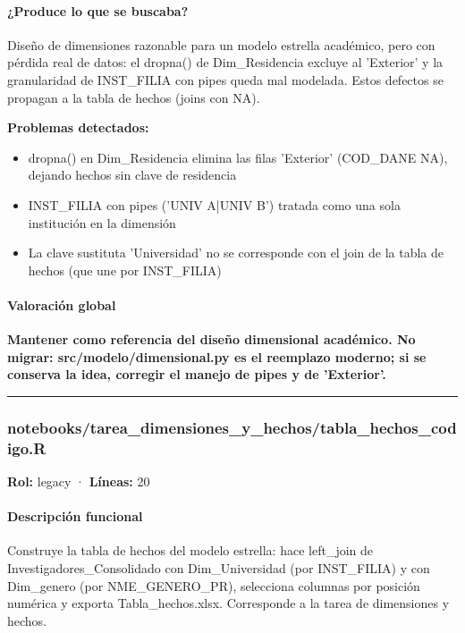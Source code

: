 \paragraph{¿Produce lo que se buscaba?}
Diseño de dimensiones razonable para un modelo estrella académico, pero con pérdida real de datos: el dropna() de Dim\_Residencia excluye al 'Exterior' y la granularidad de INST\_FILIA con pipes queda mal modelada. Estos defectos se propagan a la tabla de hechos (joins con NA).

\begin{tcolorbox}[riesgo]
\textbf{Problemas detectados:}
\begin{itemize}
  \item dropna() en Dim\_Residencia elimina las filas 'Exterior' (COD\_DANE NA), dejando hechos sin clave de residencia
  \item INST\_FILIA con pipes ('UNIV A|UNIV B') tratada como una sola institución en la dimensión
  \item La clave sustituta 'Universidad' no se corresponde con el join de la tabla de hechos (que une por INST\_FILIA)
\end{itemize}
\end{tcolorbox}

\paragraph{Valoración global}
\textbf{Mantener como referencia del diseño dimensional académico. No migrar: src/modelo/dimensional.py es el reemplazo moderno; si se conserva la idea, corregir el manejo de pipes y de 'Exterior'.}

\medskip
\hrule

\subsubsection{notebooks/tarea\_dimensiones\_y\_hechos/tabla\_hechos\_codigo.R}
\textbf{Rol:} legacy · \textbf{Líneas:} 20

\paragraph{Descripción funcional}
Construye la tabla de hechos del modelo estrella: hace left\_join de Investigadores\_Consolidado con Dim\_Universidad (por INST\_FILIA) y con Dim\_genero (por NME\_GENERO\_PR), selecciona columnas por posición numérica y exporta Tabla\_hechos.xlsx. Corresponde a la tarea de dimensiones y hechos.


